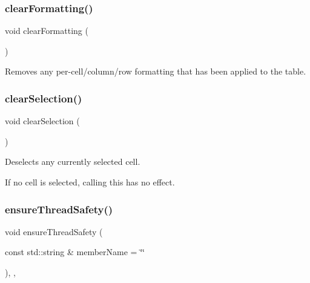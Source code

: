 \subsubsection{\texorpdfstring{clear\+Formatting()}{clearFormatting()}}
{\footnotesize\ttfamily void clear\+Formatting (\begin{DoxyParamCaption}{ }\end{DoxyParamCaption})\hspace{0.3cm}{\ttfamily [virtual]}}



Removes any per-\/cell/column/row formatting that has been applied to the table. 

\mbox{\label{classGTable_abd07e172ccec6823a88289c21124a367}} 
\subsubsection{\texorpdfstring{clear\+Selection()}{clearSelection()}}
{\footnotesize\ttfamily void clear\+Selection (\begin{DoxyParamCaption}{ }\end{DoxyParamCaption})\hspace{0.3cm}{\ttfamily [virtual]}}



Deselects any currently selected cell. 

If no cell is selected, calling this has no effect. \mbox{\label{classGObservable_a284f31528c0520f8e545c03ac9eeac74}} 
\subsubsection{\texorpdfstring{ensure\+Thread\+Safety()}{ensureThreadSafety()}}
{\footnotesize\ttfamily void ensure\+Thread\+Safety (\begin{DoxyParamCaption}\item[{const std\+::string \&}]{member\+Name = {\ttfamily \char`\"{}\char`\"{}} }\end{DoxyParamCaption})\hspace{0.3cm}{\ttfamily [protected]}, {\ttfamily [virtual]}, {\ttfamily [inherited]}}



